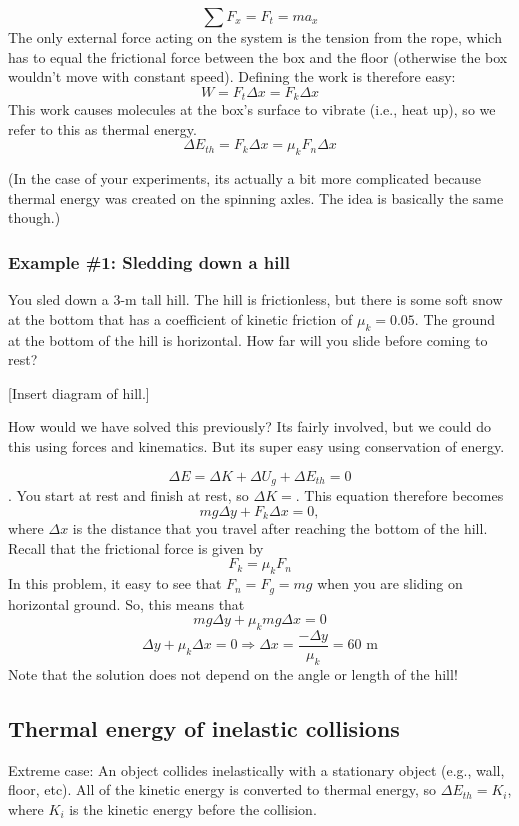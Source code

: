 $$\sum F_x=F_t=ma_x$$
The only external force acting on the system is the tension from the rope, which has to equal the frictional force between the box and the floor (otherwise the box wouldn't move with constant speed). Defining the work is therefore easy:
$$W=F_t\Delta{x}=F_k\Delta{x}$$
This work causes molecules at the box's surface to vibrate (i.e., heat up), so we refer to this as thermal energy.
$$\boxed{\Delta{E_{th}}=F_k\Delta{x}=\mu_kF_n\Delta{x}}$$

(In the case of your experiments, its actually a bit more complicated because thermal energy was created on the spinning axles. The idea is basically the same though.)

\subsubsection{Example \#1: Sledding down a hill}
You sled down a 3-m tall hill. The hill is frictionless, but there is some soft snow at the bottom that has a coefficient of kinetic friction of $\mu_k=0.05$. The ground at the bottom of the hill is horizontal. How far will you slide before coming to rest?

[Insert diagram of hill.]
\vspace{5cm}

How would we have solved this previously? Its fairly involved, but we could do this using forces and kinematics. But its super easy using conservation of energy.

$$\Delta{E}=\Delta{K}+\Delta{U_g}+\Delta{E_{th}}=0$$.
You start at rest and finish at rest, so $\Delta{K}=$. This equation therefore becomes
$$mg\Delta{y}+F_k\Delta{x}=0,$$
where $\Delta{x}$ is the distance that you travel after reaching the bottom of the hill. Recall that the frictional force is given by
$$F_k=\mu_kF_n$$
In this problem, it easy to see that $F_n=F_g=mg$ when you are sliding on horizontal ground. So, this means that
$$mg\Delta{y}+\mu_k mg\Delta{x}=0$$
$$\Delta{y}+\mu_k \Delta{x}=0\Rightarrow \boxed{\Delta{x}=\frac{-\Delta{y}}{\mu_k}=60\mbox{ m}}$$
Note that the solution does not depend on the angle or length of the hill!


\subsection{Thermal energy of inelastic collisions}
Extreme case: An object collides inelastically with a stationary object (e.g., wall, floor, etc). All of the kinetic energy is converted to thermal energy, so $\Delta{E_{th}}=K_i$, where $K_i$ is the kinetic energy before the collision. 

